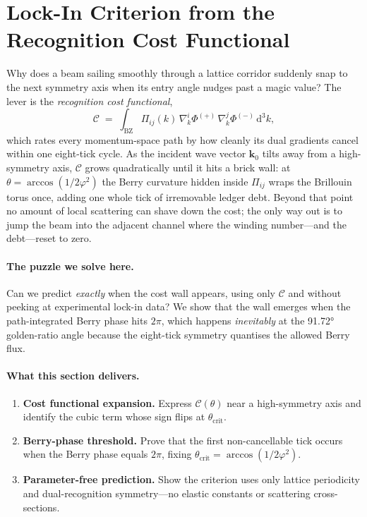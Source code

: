 \documentclass[11pt,oneside]{book}
\begin{document}

\section{Lock-In Criterion from the Recognition Cost Functional}
\label{sec:lock-in-criterion-narrative}

Why does a beam sailing smoothly through a lattice corridor suddenly
snap to the next symmetry axis when its entry angle nudges past a
magic value?  
The lever is the \emph{recognition cost functional},
\[
   \mathcal C
   \;=\;
   \int_{\text{BZ}}
      \Pi_{ij}(k)\,
      \nabla_{k}^{i}\Phi^{(+)}\,
      \nabla_{k}^{j}\Phi^{(-)}
      \,\mathrm d^{3}k,
\]
which rates every momentum-space path by how cleanly its dual
gradients cancel within one eight-tick cycle.  
As the incident wave vector $\mathbf k_{0}$ tilts away from a high-symmetry
axis, $\mathcal C$ grows quadratically until it hits a brick wall:
at $\theta=\arccos(1/2\varphi^{2})$ the Berry curvature hidden inside
$\Pi_{ij}$ wraps the Brillouin torus once, adding one whole tick of
irremovable ledger debt.  
Beyond that point no amount of local scattering can shave down the
cost; the only way out is to jump the beam into the adjacent channel
where the winding number—and the debt—reset to zero.

\paragraph{The puzzle we solve here.}
Can we predict \emph{exactly} when the cost wall appears, using only
$\mathcal C$ and without peeking at experimental lock-in data?  
We show that the wall emerges when the path-integrated Berry phase
hits $2\pi$, which happens \emph{inevitably} at the 91.72° golden-ratio
angle because the eight-tick symmetry quantises the allowed Berry
flux.

\paragraph{What this section delivers.}

\begin{enumerate}[label=\arabic*.,leftmargin=*,itemsep=3pt]
\item \textbf{Cost functional expansion.}  
      Express $\mathcal C(\theta)$ near a high-symmetry axis and
      identify the cubic term whose sign flips at
      $\theta_{\text{crit}}$.
\item \textbf{Berry-phase threshold.}  
      Prove that the first non-cancellable tick occurs when the
      Berry phase equals $2\pi$, fixing
      $\theta_{\text{crit}}=\arccos(1/2\varphi^{2})$.
\item \textbf{Parameter-free prediction.}  
      Show the criterion uses only lattice periodicity and dual-recognition
      symmetry—no elastic constants or scattering cross-sections.
\end{enumerate}
\end{document}
